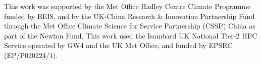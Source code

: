 \documentclass[gmd]{copernicus}
\begin{document}








\begin{acknowledgements}
This work was supported by the Met Office Hadley Centre Climate Programme funded by BEIS, and by the UK-China Research \& Innovation Partnership Fund through the Met Office Climate Science for Service Partnership (CSSP) China as part of the Newton Fund.
This work used the Isambard UK National Tier-2 HPC Service operated by GW4 and the UK Met Office, and funded by EPSRC (EP/P020224/1).
\end{acknowledgements}






\end{document}
